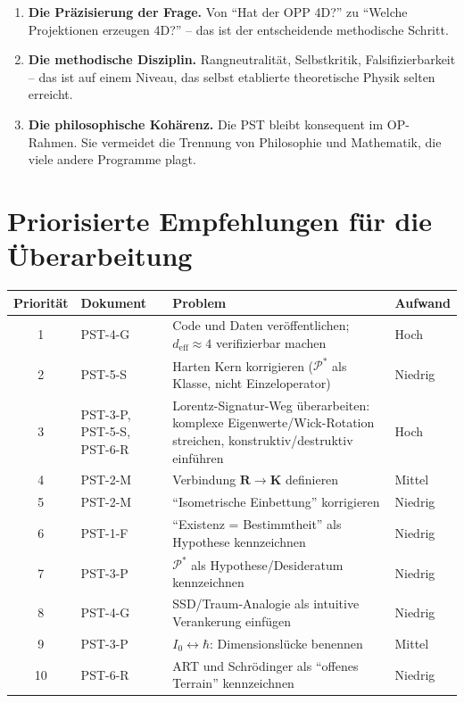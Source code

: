 \documentclass[11pt,a4paper]{article}
\begin{document}
\begin{enumerate}
  \item \textbf{Die Pr\"{a}zisierung der Frage.} Von ``Hat der OPP 4D?''
    zu ``Welche Projektionen erzeugen 4D?'' -- das ist der
    entscheidende methodische Schritt.

  \item \textbf{Die methodische Disziplin.} Rangneutralit\"{a}t,
    Selbstkritik, Falsifizierbarkeit -- das ist auf einem Niveau,
    das selbst etablierte theoretische Physik selten erreicht.

  \item \textbf{Die philosophische Koh\"{a}renz.} Die PST bleibt
    konsequent im OP-Rahmen. Sie vermeidet die Trennung von
    Philosophie und Mathematik, die viele andere Programme plagt.
\end{enumerate}

\newpage

\section{Priorisierte Empfehlungen f\"{u}r die \"{U}berarbeitung}

\begin{center}
\begin{tabular}{clp{8cm}l}
\toprule
\textbf{Priorit\"{a}t} & \textbf{Dokument} & \textbf{Problem} & \textbf{Aufwand} \\
\midrule
1 & PST-4-G & Code und Daten ver\"{o}ffentlichen; $d_{\text{eff}} \approx 4$
  verifizierbar machen & Hoch \\
2 & PST-5-S & Harten Kern korrigieren ($\mathcal{P}^*$ als Klasse, nicht
  Einzeloperator) & Niedrig \\
3 & PST-3-P, PST-5-S, PST-6-R & Lorentz-Signatur-Weg \"{u}berarbeiten:
  komplexe Eigenwerte/Wick-Rotation streichen, konstruktiv/destruktiv
  einf\"{u}hren & Hoch \\
4 & PST-2-M & Verbindung $\mathbf{R} \to \mathbf{K}$ definieren & Mittel \\
5 & PST-2-M & ``Isometrische Einbettung'' korrigieren & Niedrig \\
6 & PST-1-F & ``Existenz = Bestimmtheit'' als Hypothese kennzeichnen & Niedrig \\
7 & PST-3-P & $\mathcal{P}^*$ als Hypothese/Desideratum kennzeichnen & Niedrig \\
8 & PST-4-G & SSD/Traum-Analogie als intuitive Verankerung einf\"{u}gen & Niedrig \\
9 & PST-3-P & $I_0 \leftrightarrow \hbar$: Dimensionsl\"{u}cke benennen & Mittel \\
10 & PST-6-R & ART und Schr\"{o}dinger als ``offenes Terrain'' kennzeichnen & Niedrig \\
\bottomrule
\end{tabular}
\end{center}
\end{document}
